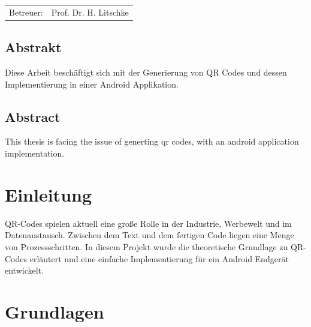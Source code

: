 \documentclass[12pt,					%
							 oneside,			%
							 a4paper,			%
							 halfparskip,		%
							 liststotoc,			%
							 bibtotoc,			%
							 fleqn,				%
							 pointlessnumbers]	%
							 {scrreprt}
\newcommand{\Betreuer}{Prof. Dr. H. Litschke}
\begin{document}
\begin{titlepage}
\begin{center}
\begin{table}[b]
\begin{tabular}{rl}
					Betreuer: & \Betreuer \\

				\end{tabular}
			\end{table}
		\end{center}
	\end{titlepage}

	\onehalfspacing 					%
	

	
\section*{Abstrakt}
Diese Arbeit beschäftigt sich mit der Generierung von QR Codes und dessen Implementierung in einer Android Applikation.
\section*{Abstract}
This thesis is facing the issue of generting qr codes, with an android application implementation.
\tableofcontents
{} 					%

\chapter{Einleitung}
QR-Codes spielen aktuell eine große Rolle in der Industrie, Werbewelt und im Datenaustausch. Zwischen dem Text und dem fertigen Code liegen eine Menge von Prozessschritten.
In diesem Projekt wurde die theoretische Grundlage zu QR-Codes erläutert und eine einfache Implementierung für ein Android Endgerät entwickelt.

\chapter{Grundlagen}
\end{document}
